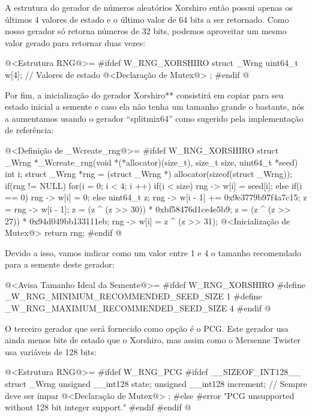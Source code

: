 A estrutura do gerador de números aleatórios Xorshiro então possui
apenas os últimos 4 valores de estado e o último valor de 64 bits a
ser retornado. Como nosso gerador só retorna números de 32 bits,
podemos aproveitar um mesmo valor gerado para retornar duas vezes:

\iniciocodigo
@<Estrutura RNG@>=
#ifdef W_RNG_XORSHIRO
struct _Wrng{
  uint64_t w[4];   // Valores de estado
  @<Declaração de Mutex@>
};
#endif
@
\fimcodigo

Por fim, a inicialização do gerador Xorshiro** consistirá em copiar
para seu estado inicial a semente e caso ela não tenha um tamanho
grande o bastante, nós a aumentamos usando o gerador ``splitmix64''
como sugerido pela implementação de referência:

\iniciocodigo
@<Definição de \_Wcreate\_rng@>=
#ifdef W_RNG_XORSHIRO
struct _Wrng *_Wcreate_rng(void *(*allocator)(size_t), size_t size,
                           uint64_t *seed){
  int i;
  struct _Wrng *rng = (struct _Wrng *) allocator(sizeof(struct _Wrng));
  if(rng != NULL){
    for(i = 0; i < 4; i ++){
      if(i < size)
        rng -> w[i] = seed[i];
      else{
        if(i == 0)
          rng -> w[i] = 0;
        else{
          uint64_t z;
          rng -> w[i - 1] += 0x9e3779b97f4a7c15; 
          z = rng -> w[i - 1];
          z = (z ^ (z >> 30)) * 0xbf58476d1ce4e5b9;
          z = (z ^ (z >> 27)) * 0x94d049bb133111eb;
          rng -> w[i] = z ^ (z >> 31);
        }
      }
    }
    @<Inicialização de Mutex@>
  }
  return rng;
}
#endif
@
\fimcodigo

Devido a isso, vamos indicar como um valor entre 1 e 4 o tamanho
recomendado para a semente deste gerador:

\iniciocodigo
@<Avisa Tamanho Ideal da Semente@>=
#ifdef W_RNG_XORSHIRO
#define _W_RNG_MINIMUM_RECOMMENDED_SEED_SIZE  1
#define _W_RNG_MAXIMUM_RECOMMENDED_SEED_SIZE  4
#endif
@
\fimcodigo



O terceiro gerador que será fornecido como opção é o PCG. Este gerador
usa ainda menos bits de estado que o Xorshiro, mas assim como o
Mersenne Twister usa variáveis de 128 bits:

\iniciocodigo
@<Estrutura RNG@>=
#ifdef W_RNG_PCG
#ifdef __SIZEOF_INT128__
struct _Wrng{
  unsigned __int128 state;
  unsigned __int128 increment; // Sempre deve ser ímpar
  @<Declaração de Mutex@>
};
#else
#error "PCG unsupported without 128 bit integer support."
#endif
#endif
@
\fimcodigo

